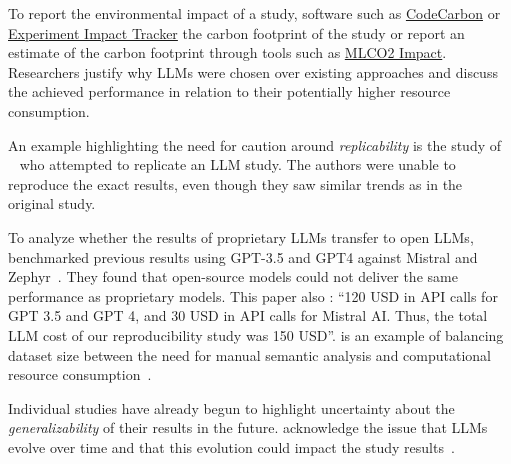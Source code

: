 To report the environmental impact of a study,  software such as \href{https://github.com/mlco2/codecarbon}{CodeCarbon} or \href{experiment-impact-tracker}{Experiment Impact Tracker}   the carbon footprint of the study or report an estimate of the carbon footprint through tools such as \href{https://mlco2.github.io/impact/#about}{MLCO2 Impact}.
Researchers \must justify why LLMs were chosen over existing approaches and discuss the achieved performance in relation to their potentially higher resource consumption.


An example highlighting the need for caution around \emph{replicability} is the study of \citeauthor{DBLP:conf/sigir-ap/StaudingerKPLH24}~\cite{DBLP:conf/sigir-ap/StaudingerKPLH24} who attempted to replicate an LLM study.
The authors were unable to reproduce the exact results, even though they saw similar trends as in the original study.

To analyze whether the results of proprietary LLMs transfer to open LLMs, \citeauthor{DBLP:conf/sigir-ap/StaudingerKPLH24} benchmarked previous results using GPT-3.5 and GPT4 against Mistral and Zephyr~\cite{DBLP:conf/sigir-ap/StaudingerKPLH24}.
They found that open-source models could not deliver the same performance as proprietary models. %
This paper also : \enquote{120 USD in API calls for GPT 3.5 and GPT 4, and 30 USD in API calls for Mistral AI. Thus, the total LLM cost of our reproducibility study was 150 USD}.
\citeauthor{tinnessoftware} is an example of balancing dataset size between the need for manual semantic analysis and computational resource consumption~\cite{tinnessoftware}.

Individual studies have already begun to highlight  uncertainty about the \emph{generalizability} of their results in the future. \citeauthor{DBLP:conf/msr/JesseADM23} acknowledge the issue that LLMs evolve over time and that this evolution could impact the study results~\cite{DBLP:conf/msr/JesseADM23}.

